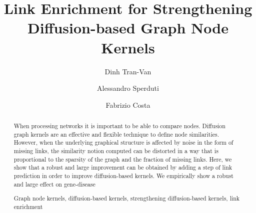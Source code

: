 \documentclass[runningheads,a4paper]{llncs}
\newcommand{\keywords}[1]{\par\addvspace\baselineskip
\noindent\keywordname\enspace\ignorespaces#1}
\begin{document}
\mainmatter  %

\title{Link Enrichment for Strengthening Diffusion-based Graph Node Kernels}


%
%
\author{Dinh Tran-Van \and Alessandro Sperduti\and Fabrizio Costa}

%


%
%

\maketitle


\begin{abstract}

When processing networks it is important to be able to compare nodes.
Diffusion graph kernels are an effective and flexible technique to define node
similarities. However, when the underlying graphical structure is affected by
noise in the form of missing links, the similarity notion computed can be
distorted in a way that is proportional to the sparsity of the graph and the
fraction of missing links. Here, we show that a robust and
large improvement can be obtained by adding a step of link prediction
in order to improve diffusion-based kernels. We empirically show a robust and
large effect on gene-disease

\keywords{Graph node kernels, diffusion-based kernels, strengthening diffusion-based kernels, link enrichment}


\end{abstract}
\end{document}
